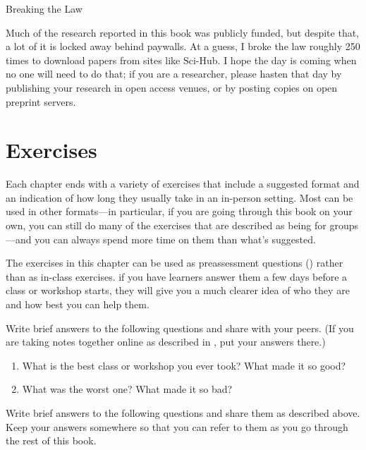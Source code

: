 \begin{callout}{Breaking the Law}

  Much of the research reported in this book was publicly funded, but
  despite that, a lot of it is locked away behind paywalls.  At a
  guess, I broke the law roughly 250 times to download papers from
  sites like Sci-Hub. I hope the day is coming when no one will need
  to do that; if you are a researcher, please hasten that day by
  publishing your research in open access venues, or by posting copies
  on open preprint servers.

\end{callout}

\section{Exercises}\label{s:intro-exercises}

Each chapter ends with a variety of exercises that include a suggested
format and an indication of how long they usually take in an in-person
setting.  Most can be used in other formats---in particular, if you
are going through this book on your own, you can still do many of the
exercises that are described as being for groups---and you can always
spend more time on them than what's suggested.

The exercises in this chapter can be used as preassessment questions
() rather than as in-class exercises.  if
you have learners answer them a few days before a class or workshop
starts, they will give you a much clearer idea of who they are and how
best you can help them.


Write brief answers to the following questions and share with your
peers.  (If you are taking notes together online as described in
, put your answers there.)

\begin{enumerate}
\item
  What is the best class or workshop you ever took? What made it so good?
\item
  What was the worst one? What made it so bad?
\end{enumerate}


Write brief answers to the following questions and share them as
described above.  Keep your answers somewhere so that you can refer to
them as you go through the rest of this book.

